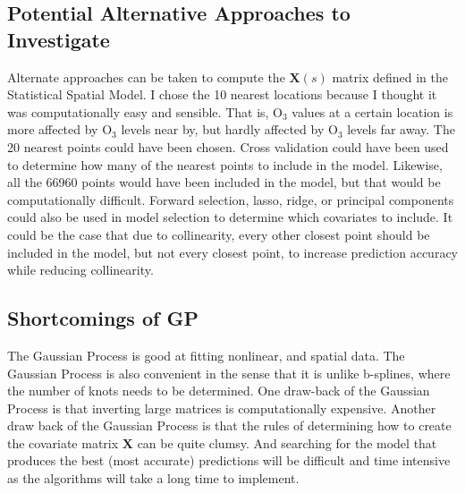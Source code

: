 \documentclass{article}                                                   %
\begin{document}
  \subsection{Potential Alternative Approaches to Investigate}
    Alternate approaches can be taken to compute the $\bm X(s)$ matrix defined
    in the Statistical Spatial Model. I chose the 10 nearest locations because
    I thought it was computationally easy and sensible. That is, O$_3$ values
    at a certain location is more affected by O$_3$ levels near by, but hardly
    affected by O$_3$ levels far away. The 20 nearest points could have been 
    chosen. Cross validation could have been used to determine how many of 
    the nearest points to include in the model. Likewise, all the 66960 
    points would have been included in the model, but that would be computationally
    difficult. Forward selection, lasso, ridge, or principal components
    could also be used in model selection to determine which covariates to include.
    It could be the case that due to collinearity, every other closest
    point should be included in the model, but not every closest point, to 
    increase prediction accuracy while reducing collinearity.

  \subsection{Shortcomings of GP}
    The Gaussian Process is good at fitting nonlinear, and spatial data.
    The Gaussian Process is also convenient in the sense that it is
    unlike b-splines, where the number of knots needs to be determined.
    One draw-back of the Gaussian Process is that inverting large matrices 
    is computationally expensive. Another draw back of the Gaussian Process
    is that the rules of determining how to create the covariate matrix $\bm X$
    can be quite clumsy. And searching for the model that produces the best 
    (most accurate) predictions will be difficult and time intensive as the
    algorithms will take a long time to implement.
\end{document}
